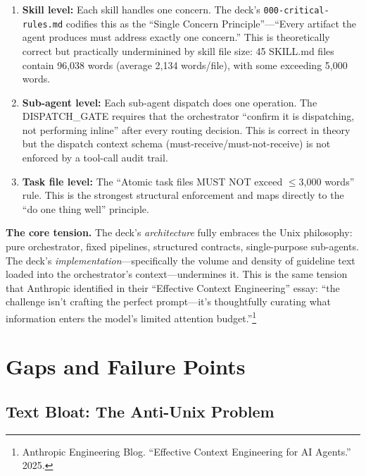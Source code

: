 \documentclass[11pt,a4paper]{article}
\begin{document}
\begin{enumerate}[leftmargin=*]
  \item \textbf{Skill level:} Each skill handles one concern.  The deck's \texttt{000-critical-rules.md} codifies this as the ``Single Concern Principle''---``Every artifact the agent produces must address exactly one concern.''  This is theoretically correct but practically underminined by skill file size: 45 SKILL.md files contain 96,038 words (average 2,134 words/file), with some exceeding 5,000 words.

  \item \textbf{Sub-agent level:} Each sub-agent dispatch does one operation.  The DISPATCH\_GATE requires that the orchestrator ``confirm it is dispatching, not performing inline'' after every routing decision.  This is correct in theory but the dispatch context schema (must-receive/must-not-receive) is not enforced by a tool-call audit trail.

  \item \textbf{Task file level:} The ``Atomic task files MUST NOT exceed $\leq$3,000 words'' rule.  This is the strongest structural enforcement and maps directly to the ``do one thing well'' principle.
\end{enumerate}

\begin{insightbox}
\textbf{The core tension.}  The deck's \emph{architecture} fully embraces the Unix philosophy: pure orchestrator, fixed pipelines, structured contracts, single-purpose sub-agents.  The deck's \emph{implementation}---specifically the volume and density of guideline text loaded into the orchestrator's context---undermines it.  This is the same tension that Anthropic identified in their ``Effective Context Engineering'' essay: ``the challenge isn't crafting the perfect prompt---it's thoughtfully curating what information enters the model's limited attention budget.''\footnote{Anthropic Engineering Blog.  ``Effective Context Engineering for AI Agents.''  2025.}
\end{insightbox}

\newpage

\section{Gaps and Failure Points}
\label{sec:gaps}

\subsection{Text Bloat: The Anti-Unix Problem}
\end{document}
